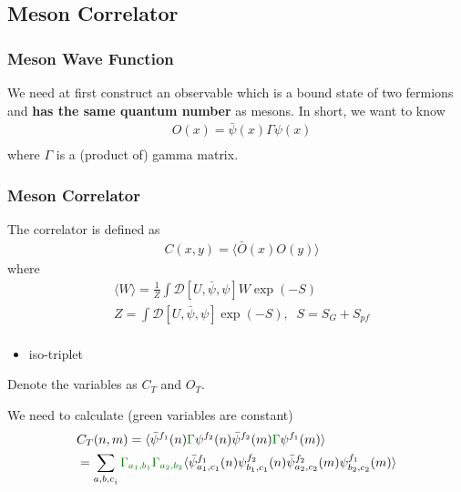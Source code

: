 \subsection{\label{MesonCorrelator}Meson Correlator}

\subsubsection{\label{MesonWaveFunction}Meson Wave Function}

We need at first construct an observable which is a bound state of two fermions and \textbf{has the same quantum number} as mesons. In short, we want to know
\begin{equation}
\begin{split}
&O(x)=\bar{\psi}(x)\Gamma \psi (x)\\
\end{split}
\end{equation}
where $\Gamma$ is a (product of) gamma matrix.

\subsubsection{\label{MesonCorrelatorSub}Meson Correlator}

The correlator is defined as
\begin{equation}
\begin{split}
&C(x,y)=\langle \bar{O}(x)O(y)\rangle
\end{split}
\end{equation}
where
\begin{equation}
\begin{split}
&\langle W \rangle = \frac{1}{Z}\int \mathcal{D}[U,\bar{\psi},\psi] W \exp \left(-S\right)\\
&Z=\int \mathcal{D}[U,\bar{\psi},\psi] \exp \left(-S\right),\;\;S=S_G+S_{pf}\\
\end{split}
\end{equation}

\begin{itemize}
  \item iso-triplet
\end{itemize}

Denote the variables as $C_T$ and $O_T$.

We need to calculate (green variables are constant)
\begin{equation}
\begin{split}
&C_T(n,m)=\langle \bar{\psi} ^{f_1} (n)\textcolor[rgb]{0,0.5,0}{\Gamma}\psi ^{f_2} (n)\bar{\psi} ^{f_2} (m)\textcolor[rgb]{0,0.5,0}{\Gamma}\psi ^{f_1}(m)\rangle \\
&=\sum _{{a,b,c}_i}\textcolor[rgb]{0,0.5,0}{\Gamma _{a_1,b_1}}\textcolor[rgb]{0,0.5,0}{\Gamma _{a_2,b_2}}\langle \bar{\psi} ^{f_1} _{a_1,c_1} (n)\psi ^{f_2} _{b_1,c_1} (n)\bar{\psi} ^{f_2} _{a_2,c_2}(m)\psi ^{f_1}_{b_2,c_2}(m)\rangle\\
\end{split}
\end{equation}

